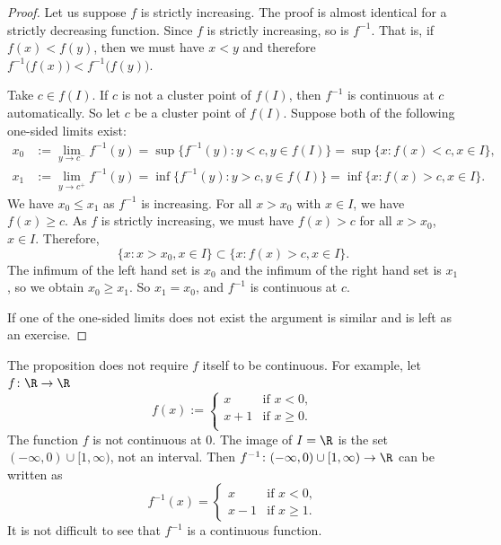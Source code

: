 \documentclass[12pt]{book}
\begin{document}
\begin{proof}
Let us suppose $f$ is strictly increasing.
The proof is almost
identical for a strictly decreasing function.
Since $f$ is strictly increasing, so is $f^{-1}$.
That is, if $f(x) <
f(y)$, then we must have $x < y$ and therefore
$f^{-1}\bigl(f(x)\bigr) < f^{-1}\bigl(f(y)\bigr)$.

Take $c \in f(I)$.
If $c$ is not a cluster point of $f(I)$, then $f^{-1}$ is continuous at $c$
automatically.
So let $c$ be a cluster point of $f(I)$.
Suppose both of the following one-sided limits exist:
\begin{align*}
x_0 & := \lim_{y \to c^-} f^{-1}(y) =
\sup \{ f^{-1}(y) : y < c, y \in f(I) \}
=
\sup \{ x : f(x) < c, x \in I \} , \\
x_1 & := \lim_{y \to c^+} f^{-1}(y) =
\inf \{ f^{-1}(y) : y > c, y \in f(I) \}
=
\inf \{ x : f(x) > c, x \in I \} .
\end{align*}
We have $x_0 \leq x_1$ as $f^{-1}$ is increasing.
For all $x > x_0$ with $x \in I$, we have $f(x) \geq c$.
As $f$ is strictly increasing,
we must have $f(x) > c$ for all $x > x_0$, $x \in I$.
Therefore,
\begin{equation*}
\{ x : x > x_0, x \in I \} \subset \{ x : f(x) > c, x \in I \}.
\end{equation*}
The infimum of the left hand set is $x_0$ and the infimum of the right hand
set is $x_1$, so we obtain $x_0 \geq x_1$.
So $x_1 = x_0$, and $f^{-1}$ is continuous at $c$.

If one of the one-sided limits does not exist the argument is similar
and is left as an exercise.
\end{proof}

\begin{example}
The proposition does not require $f$ itself to be continuous.
For example, let
$f \colon \R \to \R$
\begin{equation*}
f(x) :=
\begin{cases}
x & \text{if $x < 0$}, \\
x+1 & \text{if $x \geq 0$}. \\
\end{cases}
\end{equation*}
The function $f$ is not continuous at $0$.
The image of $I = \R$ is the set 
$(-\infty,0)\cup [1,\infty)$, not an interval.
Then $f^{-1} \colon (-\infty,0)\cup [1,\infty)
\to \R$ can be written as
\begin{equation*}
f^{-1}(x) =
\begin{cases}
x & \text{if $x < 0$}, \\
x-1 & \text{if $x \geq 1$}. 
\end{cases}
\end{equation*}
It is not difficult to see that $f^{-1}$ is a continuous function.
\end{example}
\end{document}
